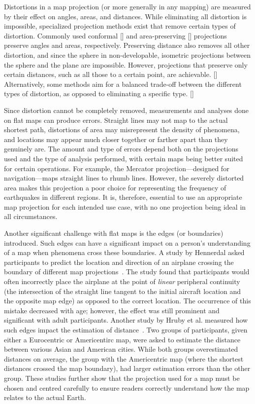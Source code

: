 Distortions in a map projection (or more generally in any mapping) are measured by their effect on angles, areas, and distances.
While eliminating all distortion is impossible, specialized projection methods exist that remove certain types of distortion.
Commonly used conformal [] and area-preserving [] projections preserve angles and areas, respectively.
Preserving distance also removes all other distortion, and since the sphere in non-developable, isometric projections between the sphere and the plane are impossible.
However, projections that preserve only certain distances, such as all those to a certain point, are achievable. []
Alternatively, some methods aim for a balanced trade-off between the different types of distortion, as opposed to eliminating a specific type. []
\cite{mathematics paper on distortion}
\cite{planar area preserving}
\cite{planar conformal}


Since distortion cannot be completely removed, measurements and analyses done on flat maps can produce errors.
Straight lines may not map to the actual shortest path, distortions of area may misrepresent the density of phenomena, and locations may appear much closer together or farther apart than they genuinely are.
The amount and type of errors depend both on the projections used and the type of analysis performed, with certain maps being better suited for certain operations.
For example, the Mercator projection---designed for navigation---maps straight lines to rhumb lines.
However, the severely distorted area makes this projection a poor choice for representing the frequency of earthquakes in different regions.
It is, therefore, essential to use an appropriate map projection for each intended use case, with no one projection being ideal in all circumstances.


Another significant challenge with flat maps is the edges (or boundaries) introduced.
Such edges can have a significant impact on a person's understanding of a map when phenomena cross these boundaries.
A study by Hennerdal asked participants to predict the location and direction of an airplane crossing the boundary of different map projections~\cite{hennerdal2015beyond}.
The study found that participants would often incorrectly place the airplane at the point of \textit{linear} peripheral continuity (the intersection of the straight line tangent to the initial aircraft location and the opposite map edge) as opposed to the correct location.
The occurrence of this mistake decreased with age; however, the effect was still prominent and significant with adult participants. Another study by Hruby et al. measured how such edges impact the estimation of distance~\cite{hruby2016journey}.
Two groups of participants, given either a Eurocentric or Americentirc map, were asked to estimate the distance between various Asian and American cities.
While both groups overestimated distances on average, the group with the Americentric map (where the shortest distances crossed the map boundary), had larger estimation errors than the other group.
These studies further show that the projection used for a map must be chosen and centred carefully to ensure readers correctly understand how the map relates to the actual Earth.


